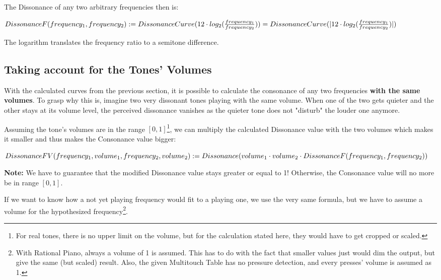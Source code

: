 \documentclass[12pt,a4paper,titlepage,oneside]{report}
\begin{document}
The Dissonance of any two arbitrary frequencies then is:

$
DissonanceF(frequency_1,frequency_2) := \\
DissonanceCurve(12 \cdot log_2(\frac{frequency_1}{frequency_2})) = \\
DissonanceCurve(| 12 \cdot log_2(\frac{frequency_1}{frequency_2}) |)
$ %

The logarithm translates the frequency ratio to a semitone difference.


\subsection{Taking account for the Tones' Volumes}

With the calculated curves from the previous section, it is possible to calculate the consonance of any two frequencies \textbf{with the same volumes}. To grasp why this is, imagine two very dissonant tones playing with the same volume. When one of the two gets quieter and the other stays at its volume level, the perceived dissonance vanishes as the quieter tone does not "disturb" the louder one anymore.

Assuming the tone's volumes are in the range $[0,1]$\footnote{For real tones, there is no upper limit on the volume, but for the calculation stated here, they would have to get cropped or scaled.}, we can multiply the calculated Dissonance value with the two volumes which makes it smaller and thus makes the Consonance value bigger:

$
DissonanceFV(frequency_1,volume_1,frequency_2,volume_2) := \\
Dissonance(volume_1 \cdot volume_2 \cdot DissonanceF(frequency_1,frequency_2))
$ %

\textbf{Note:} We have to guarantee that the modified Dissonance value stays greater or equal to 1! Otherwise, the Consonance value will no more be in range $[0,1]$.

If we want to know how a not yet playing frequency would fit to a playing one, we use the very same formula, but we have to assume a volume for the hypothesized frequency\footnote{With Rational Piano, always a volume of 1 is assumed. This has to do with the fact that smaller values just would dim the output, but give the same (but scaled) result. Also, the given Multitouch Table has no pressure detection, and every presses' volume is assumed as 1.}.

\end{document}
